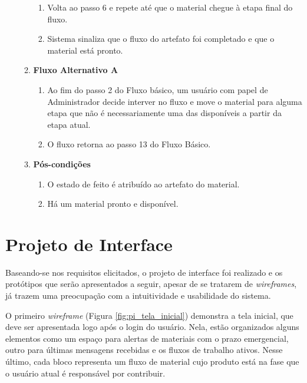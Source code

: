 \begin{enumerate}[label=\textbf{UC\protect\twodigits{\theenumi}}, leftmargin=2cm]
\begin{enumerate}[label=, leftmargin=0cm]
\begin{enumerate}[label=\arabic*.]
				\item Volta ao passo 6 e repete até que o material chegue à etapa final do fluxo.
				\item Sistema sinaliza que o fluxo do artefato foi completado e que o material está pronto.
			\end{enumerate}
		\item \textbf{Fluxo Alternativo A}
			\begin{enumerate}[label=\arabic*.]
				\item Ao fim do passo 2 do Fluxo básico, um usuário com papel de Administrador decide interver no fluxo e move o material para alguma etapa que não é necessariamente uma das disponíveis a partir da etapa atual.
				\item O fluxo retorna ao passo 13 do Fluxo Básico.
			\end{enumerate}
		\item \textbf{Pós-condições}
			\begin{enumerate}[label=\arabic*.]
				\item O estado de feito é atribuído ao artefato do material.
				\item Há um material pronto e disponível.
			\end{enumerate}
	\end{enumerate}
	 
\end{enumerate}


\section{Projeto de Interface}

Baseando-se nos requisitos elicitados, o projeto de interface foi realizado e os protótipos que serão apresentados a seguir, apesar de se tratarem de \textit{wireframes}, já trazem uma preocupação com a intuitividade e usabilidade do sistema.

O primeiro \textit{wireframe} (Figura \hyperref[fig:pi_tela_inicial]{\ref{fig:pi_tela_inicial}}) demonstra a tela inicial, que deve ser apresentada logo após o login do usuário. Nela, estão organizados alguns elementos como um espaço para alertas de materiais com o prazo emergencial, outro para últimas mensagens recebidas e os fluxos de trabalho ativos. Nesse último, cada bloco representa um fluxo de material cujo produto está na fase que o usuário atual é responsável por contribuir.

